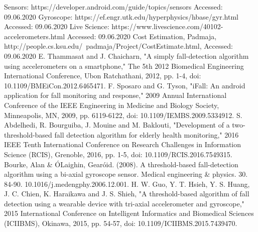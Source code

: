 \documentclass[conference]{IEEEtran}
\begin{document}
\begin{thebibliography}{00}
 Sensors: https://developer.android.com/guide/topics/sensors Accessed: 09.06.2020
 Gyroscope:
https://ef.engr.utk.edu/hyperphysics/hbase/gyr.html Accessed: 09.06.2020
 Live Science: https://www.livescience.com/40102-accelerometers.html Accessed: 09.06.2020
 Cost Estimation, Padmaja,  http://people.cs.ksu.edu/~padmaja/Project/CostEstimate.html,  Accessed: 09.06.2020
E. Thammasat and J. Chaicharn, "A simply fall-detection algorithm using accelerometers on a smartphone," The 5th 2012 Biomedical Engineering International Conference, Ubon Ratchathani, 2012, pp. 1-4, doi: 10.1109/BMEiCon.2012.6465471.
F. Sposaro and G. Tyson, "iFall: An android application for fall monitoring and response," 2009 Annual International Conference of the IEEE Engineering in Medicine and Biology Society, Minneapolis, MN, 2009, pp. 6119-6122, doi: 10.1109/IEMBS.2009.5334912.
S. Abdelhedi, R. Bourguiba, J. Mouine and M. Baklouti, "Development of a two-threshold-based fall detection algorithm for elderly health monitoring," 2016 IEEE Tenth International Conference on Research Challenges in Information Science (RCIS), Grenoble, 2016, pp. 1-5, doi: 10.1109/RCIS.2016.7549315.
Bourke, Alan \& ÓLaighin, Gearóid. (2008). A threshold-based fall-detection algorithm using a bi-axial gyroscope sensor. Medical engineering \& physics. 30. 84-90. 10.1016/j.medengphy.2006.12.001.
H. W. Guo, Y. T. Hsieh, Y. S. Huang, J. C. Chien, K. Haraikawa and J. S. Shieh, "A threshold-based algorithm of fall detection using a wearable device with tri-axial accelerometer and gyroscope," 2015 International Conference on Intelligent Informatics and Biomedical Sciences (ICIIBMS), Okinawa, 2015, pp. 54-57, doi: 10.1109/ICIIBMS.2015.7439470.

\end{thebibliography}
\vspace{12pt}
\end{document}
